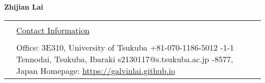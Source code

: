 \documentclass[11pt]{article}
\newcommand{\headingfont}{\LARGE \MakeUppercase }
\newenvironment{SectionTable}[1]{
	\renewcommand*{\arraystretch}{1.0}
	\setlength{\tabcolsep}{10pt}
	\begin{longtable}{Rp{5.7in}} 
		\rule{2.5cm}{4pt} 
		& \underline{#1} \\ %
	}
	{
	\end{longtable}\vspace{-.3cm}
}
\begin{document}
	

\thispagestyle{plain}  %


\begin{center}
	{\Huge \bf Zhijian Lai} 
\end{center}
\begin{SectionTable}{\headingfont Contact Information} 
	&
	Office: 3E310, University of Tsukuba \hfill +81-070-1186-5012 -1-1 Tennodai, Tsukuba, Ibaraki \hfill s2130117@s.tsukuba.ac.jp -8577, Japan  \hfill 
	Homepage: \href{https://galvinlai.github.io}{https://galvinlai.github.io}	
\end{SectionTable}





\end{document}
